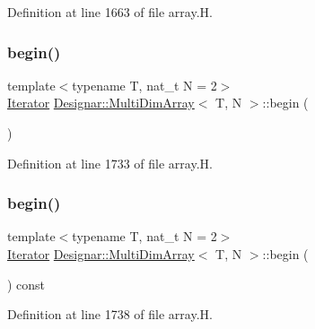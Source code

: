 Definition at line 1663 of file array.\+H.

\mbox{\label{class_designar_1_1_multi_dim_array_adaed0d8dcdb5500e751f27418e914c4d}} 
\subsubsection{\texorpdfstring{begin()}{begin()}\hspace{0.1cm}{\footnotesize\ttfamily [1/2]}}
{\footnotesize\ttfamily template$<$typename T, nat\+\_\+t N = 2$>$ \\
\hyperlink{class_designar_1_1_multi_dim_array_1_1_iterator}{Iterator} \hyperlink{class_designar_1_1_multi_dim_array}{Designar\+::\+Multi\+Dim\+Array}$<$ T, N $>$\+::begin (\begin{DoxyParamCaption}{ }\end{DoxyParamCaption})\hspace{0.3cm}{\ttfamily [inline]}}



Definition at line 1733 of file array.\+H.

\mbox{\label{class_designar_1_1_multi_dim_array_ad3760c3ce200ee63585ab7c7841b433d}} 
\subsubsection{\texorpdfstring{begin()}{begin()}\hspace{0.1cm}{\footnotesize\ttfamily [2/2]}}
{\footnotesize\ttfamily template$<$typename T, nat\+\_\+t N = 2$>$ \\
\hyperlink{class_designar_1_1_multi_dim_array_1_1_iterator}{Iterator} \hyperlink{class_designar_1_1_multi_dim_array}{Designar\+::\+Multi\+Dim\+Array}$<$ T, N $>$\+::begin (\begin{DoxyParamCaption}{ }\end{DoxyParamCaption}) const\hspace{0.3cm}{\ttfamily [inline]}}



Definition at line 1738 of file array.\+H.


